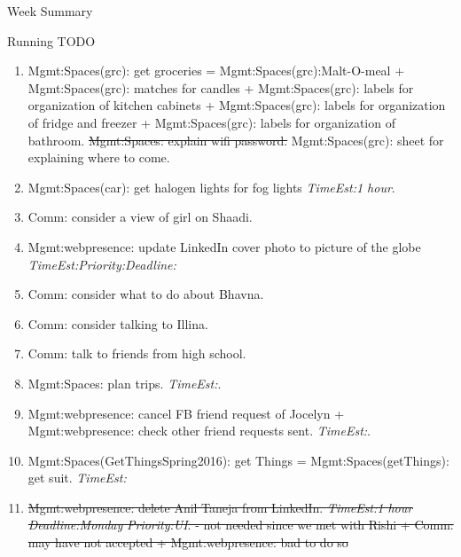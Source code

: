 \documentclass[serif, mathserif, final]{beamer}
\newcommand{\doneTaskNoItem}[1]{\sout{#1}}
\newcommand{\doneTask}[1]{\tiny \item \tiny \sout{#1}}
\newcommand{\te}[1]{\textit{TimeEst:}\textit{#1}}
\newcommand{\dl}[1]{\textit{Deadline:}\textit{#1}}
\newcommand{\pr}[1]{\textit{Priority:}\textit{#1}}
\begin{document}
\begin{frame}
\begin{columns}
\begin{column}{0.5\linewidth}
\begin{block}{Week Summary}
\begin{block}{Running TODO}
\begin{enumerate}
        
      \item \tiny Mgmt:Spaces(grc): get groceries =
        Mgmt:Spaces(grc):Malt-O-meal + Mgmt:Spaces(grc): matches for
        candles + Mgmt:Spaces(grc): labels for organization of kitchen
        cabinets + Mgmt:Spaces(grc): labels for organization of fridge and freezer +
        Mgmt:Spaces(grc): labels for organization of bathroom. 
        \doneTaskNoItem{Mgmt:Spaces: explain wifi password.} 
        Mgmt:Spaces(grc): sheet for explaining where to come. 

      \item \tiny  Mgmt:Spaces(car): get halogen lights for fog lights
        \te{1 hour}. 
          
      \item \tiny Comm: consider a view of girl on Shaadi. 

      \item \tiny Mgmt:webpresence: update LinkedIn cover photo to picture
        of the globe \te{}\pr{}\dl{} 

      \item \tiny Comm: consider what to do about Bhavna. 
      \item \tiny Comm: consider talking to Illina. 
      \item \tiny Comm: talk to friends from high school.
      \item \tiny Mgmt:Spaces: plan trips. \te{}. 

      \item \tiny Mgmt:webpresence: cancel FB friend request of
        Jocelyn + Mgmt:webpresence: check other friend requests
        sent. \te{}. 

      \item \tiny Mgmt:Spaces(GetThingsSpring2016): get Things =
        Mgmt:Spaces(getThings): get suit. \te{}
 
      \doneTask{Mgmt:webpresence: delete Anil Taneja from
        LinkedIn. \te{1 hour} \dl{Monday} \pr{UI}. - not needed since
        we met with Rishi  + Comm: may have not accepted +
        Mgmt:webpresence: bad to do so} 


        \end{enumerate}
      \end{block}

      

\end{block}
\end{column}
\end{columns}
\end{frame}
\end{document}
